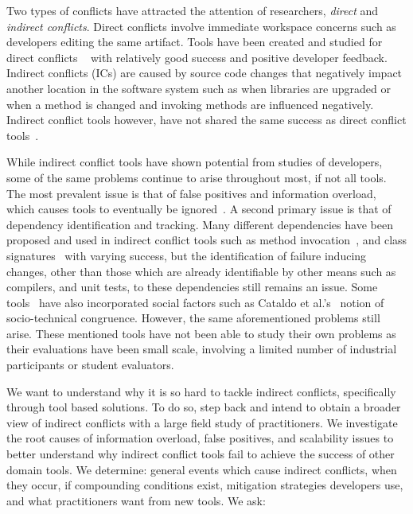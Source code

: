 \documentclass[conference]{IEEEtran}
\begin{document}
Two types of conflicts have attracted the attention of researchers, \textit{direct} and
\textit{indirect conflicts}. Direct conflicts involve immediate workspace concerns such as developers editing the same
artifact. Tools have been created and studied for direct conflicts
~\cite{Xiang:2008:ERT, Biehl:2007:FVD, Sarma:2009:TIV, Khurana:2009:PFC} with relatively good success and
positive developer feedback. Indirect conflicts (ICs) are caused by source code changes that negatively impact another
location in the software system such as when libraries are upgraded or when a method is changed
and invoking methods are influenced negatively. Indirect conflict tools however, have
not shared the same success as direct conflict
tools~\cite{Sarma:2007:TSA, Holmes:2010:CAR, Trainer:2005:BGT, Servant:2010:CPI, Borici:2012:CHA}.

While indirect conflict tools have shown potential from studies of developers, some of the same problems continue
to arise throughout most, if not all tools. The most prevalent issue is that of false positives and information
overload, which causes tools to eventually be
ignored~\cite{Sarma:2007:TSA, Servant:2010:CPI}. A second primary issue is that of dependency identification and
tracking. Many different dependencies have been proposed and used in indirect conflict tools such as method
invocation~\cite{Trainer:2005:BGT}, and class signatures~\cite{Sarma:2007:TSA} with varying success, but the
identification of failure inducing changes, other than those which are already identifiable by other means such
as compilers, and unit tests, to these dependencies still remains an issue.
Some tools~\cite{Kwan:2011:ESC, Begel:2010:CDE, Borici:2012:CHA} have also incorporated social factors 
such as Cataldo et al.'s~\cite{Cataldo:2006:ICR} notion of socio-technical
congruence.
However, the same aforementioned problems still arise. These mentioned tools have not been able to study their own 
problems as their evaluations have
been small scale, involving a limited number of industrial participants or student evaluators.

We want to understand why it is so hard to tackle indirect conflicts, specifically through tool based solutions.
To do so, step back and intend to obtain a broader view of indirect conflicts
with a large field study of practitioners. We investigate the root causes of information overload, false positives, and
scalability issues to better understand why indirect conflict tools fail to achieve
the success of other domain tools. We determine: general events which 
cause indirect conflicts, when they occur, if compounding conditions exist, mitigation strategies developers
use, and what practitioners want from new tools.
We ask:
\end{document}
